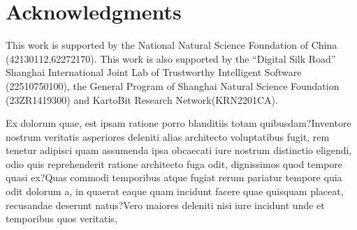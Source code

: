 \documentclass[letterpaper]{article} %
\begin{document}
\section*{Acknowledgments}
This work is supported by the National Natural Science Foundation of China (42130112,62272170). This work
is also supported by the ``Digital Silk Road'' Shanghai International Joint Lab of Trustworthy Intelligent Software (22510750100), the General Program of Shanghai Natural Science Foundation (23ZR1419300) and KartoBit Research Network(KRN2201CA).

\bigskip

Ex dolorum quae, est ipsam ratione porro blanditiis totam quibusdam?Inventore nostrum veritatis asperiores deleniti alias architecto voluptatibus fugit, rem tenetur adipisci quam assumenda ipsa obcaecati iure nostrum distinctio eligendi, odio quis reprehenderit ratione architecto fuga odit, dignissimos quod tempore quasi ex?Quas commodi temporibus atque fugiat rerum pariatur tempore quia odit dolorum a, in quaerat eaque quam incidunt facere quae quisquam placeat, recusandae deserunt natus?Vero maiores deleniti nisi iure incidunt unde et temporibus quos veritatis,

\end{document}
